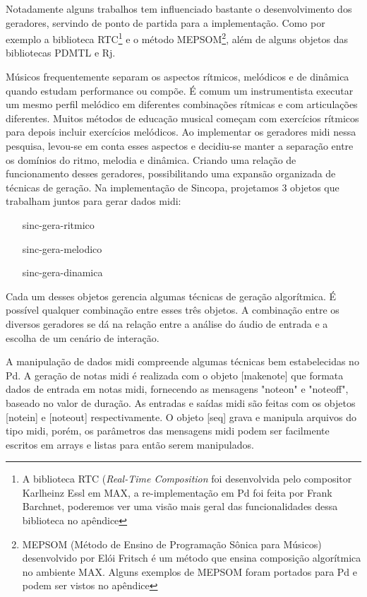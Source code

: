 \documentclass{ppgmus}
\begin{document}
Notadamente alguns trabalhos tem influenciado bastante o desenvolvimento
dos geradores, servindo de ponto de partida para a implementação. Como
por exemplo a biblioteca RTC\footnote{A biblioteca RTC (\textit{Real-Time Composition} 
foi desenvolvida pelo compositor Karlheinz Essl em MAX, a re-implementação
em Pd foi feita por Frank Barchnet, poderemos ver uma visão mais geral
das funcionalidades dessa biblioteca no apêndice} e o método MEPSOM\footnote{
MEPSOM (Método de Ensino de Programação Sônica para Músicos) desenvolvido por
Elói Fritsch é um método que ensina composição algorítmica no ambiente MAX. Alguns
exemplos de MEPSOM foram portados para Pd e podem ser vistos no apêndice}, além
de alguns objetos das bibliotecas PDMTL e Rj.  


Músicos frequentemente separam os aspectos rítmicos, melódicos e de dinâmica
quando estudam performance ou compõe. É comum um instrumentista executar um 
mesmo perfil melódico em diferentes combinações rítmicas e com articulações
diferentes. Muitos métodos de educação musical começam com exercícios rítmicos
para depois incluir exercícios melódicos. Ao implementar os geradores midi
nessa pesquisa, levou-se em conta esses aspectos e decidiu-se manter a separação
entre os domínios do ritmo, melodia e dinâmica. Criando uma relação de funcionamento
desses geradores, possibilitando uma expansão organizada de técnicas de geração.
Na implementação de Sincopa, projetamos 3 objetos que trabalham juntos para
gerar dados midi: 

\begin{itemize}
 \item   [sinc-gera-ritmico]
 \item   [sinc-gera-melodico]
 \item   [sinc-gera-dinamica]
\end{itemize}

Cada um desses objetos gerencia algumas técnicas de geração
algorítmica. É possível qualquer combinação entre esses três objetos.
A combinação entre os diversos geradores se dá na relação entre a 
análise do áudio de entrada e a escolha de um cenário de interação. 

A manipulação de dados midi compreende algumas técnicas bem estabelecidas
no Pd. A geração de notas midi é realizada com o objeto [makenote] que formata
dados de entrada em notas midi, fornecendo as mensagens "noteon" e "noteoff", baseado
no valor de duração. As entradas e saídas midi são feitas com os objetos
[notein] e [noteout] respectivamente. O objeto [seq] grava e manipula arquivos 
do tipo midi, porém, os parâmetros das mensagens midi podem ser facilmente escritos
em arrays e listas para então serem manipulados.
\end{document}
